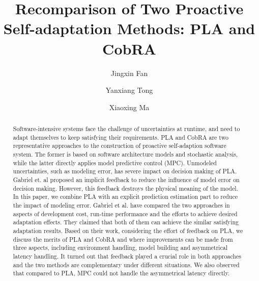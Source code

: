 \documentclass[sigconf]{acmart}
\begin{document}
	
	\title{Recomparison of Two Proactive Self-adaptation Methods: PLA and CobRA}
	
	\author{Jingxin Fan}
	
	\author{Yanxiang Tong}
	
	\author{Xiaoxing Ma}
	
	
	\begin{abstract}
		Software-intensive systems face the challenge of uncertainties at runtime, 
		and need to adapt themselves to keep satisfying their requirements. 
		PLA and CobRA are two representative approaches to the construction of proactive self-adaption software system.
		The former is based on software architecture models and stochastic analysis, 
		while the latter directly applies model predictive control (MPC). 
		Unmodeled uncertainties, such as modeling error, has severe impact on decision making of PLA. Gabriel et. al proposed an implicit feedback to reduce the influence of model error on decision making. However, this feedback destroys the physical meaning of the model. In this paper, we combine PLA with an explicit prediction estimation part to reduce the impact of modeling error.
		Gabriel et al. have compared the two approaches in aspects of development cost, run-time performance 
		and the efforts to achieve desired adaptation effects. 
		They claimed that both of them can achieve the similar satisfying adaptation results. Based on their work, considering the effort of feedback on PLA, we discuss the merits of PLA and CobRA and where improvements can be made from three aspects, including environment handling, model building and asymmetrical latency handling. It turned out that feedback played a crucial role in both approaches and the two methods are complementary under different situations. 
		We also observed that compared to PLA, MPC could not handle the asymmetrical latency directly.
	\end{abstract}
	
\end{document}
